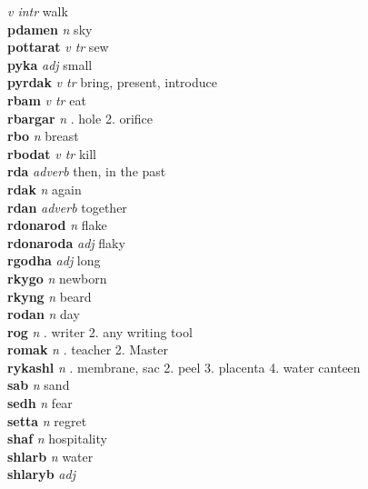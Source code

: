  \emph{v intr} \textperiodcentered walk\\\textbf{pdamen}   \emph{n} \textperiodcentered sky\\\textbf{pottarat}   \emph{v tr} \textperiodcentered sew\\\textbf{pyka}   \emph{adj} \textperiodcentered small\\\textbf{pyrdak}   \emph{v tr} \textperiodcentered bring, present, introduce\\\textbf{rbam}   \emph{v tr} \textperiodcentered eat\\\textbf{rbargar}   \emph{n} . hole 2. orifice \\\textbf{rbo}   \emph{n} \textperiodcentered breast\\\textbf{rbodat}   \emph{v tr} \textperiodcentered kill\\\textbf{rda}   \emph{adverb} \textperiodcentered then, in the past\\\textbf{rdak}   \emph{n} \textperiodcentered again\\\textbf{rdan}   \emph{adverb} \textperiodcentered together\\\textbf{rdonarod}   \emph{n} \textperiodcentered flake\\\textbf{rdonaroda}   \emph{adj} \textperiodcentered flaky\\\textbf{rgodha}   \emph{adj} \textperiodcentered long\\\textbf{rkygo}   \emph{n} \textperiodcentered newborn\\\textbf{rkyng}   \emph{n} \textperiodcentered beard\\\textbf{rodan}   \emph{n} \textperiodcentered day\\\textbf{rog}   \emph{n} . writer 2. any writing tool \\\textbf{romak}   \emph{n} . teacher 2. Master \\\textbf{rykashl}   \emph{n} . membrane, sac 2. peel 3. placenta 4. water canteen \\\textbf{sab}   \emph{n} \textperiodcentered sand\\\textbf{sedh}   \emph{n} \textperiodcentered fear\\\textbf{setta}   \emph{n} \textperiodcentered regret\\\textbf{shaf}   \emph{n} \textperiodcentered hospitality\\\textbf{shlarb}   \emph{n} \textperiodcentered water\\\textbf{shlaryb}   \emph{adj} 